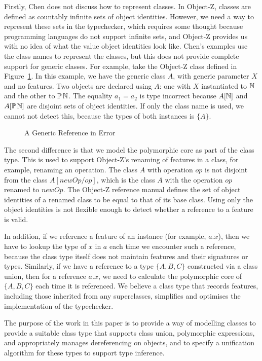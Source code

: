 Firstly, Chen does not discuss how to represent classes. In Object-Z,
classes are defined as countably infinite sets of object
identities. However, we need a way to represent these sets in the
typechecker, which requires some thought because programming languages
do not support infinite sets, and Object-Z provides us with no idea of
what the value object identities look like. Chen's examples use the
class names to represent the classes, but this does not provide
complete support for generic classes. For example, take the Object-Z
class defined in Figure~\ref{generic-class-A}.  In this example, we
have the generic class $A$, with generic parameter $X$ and no
features.  Two objects are declared using $A$: one with $X$
instantiated to ${\mathbb N}$ and the other to $\power \nat$. The equality
$a_{1} = a_{2}$ is type incorrect because $A[{\mathbb N}]$ and $A[\power
\nat]$ are disjoint sets of object identities. If only the class name
is used, we cannot not detect this, because the types of both
instances is $\{A\}$.

\begin{figure}[t]

\caption{A Generic Reference in Error}
\label{generic-class-A}
\end{figure}

The second difference is that we model the polymorphic core as part of
the class type. This is used to support Object-Z's renaming of
features in a class, for example, renaming an operation. The class $A$
with operation $op$ is not disjoint from the class $A[newOp/op]$,
which is the class $A$ with the operation $op$ renamed to $newOp$. The
Object-Z reference manual \cite{smith00} defines the set of object
identities of a renamed class to be equal to that of its base
class. Using only the object identities is not flexible enough to
detect whether a reference to a feature is valid.

In addition, if we reference a feature of an instance (for example,
$a.x$), then we have to lookup the type of $x$ in $a$ each time we
encounter such a reference, because the class type itself does not
maintain features and their signatures or types.  Similarly, if we
have a reference to a type $\{ A, B, C\}$ constructed via a class
union, then for a reference $a.x$, we need to calculate the
polymorphic core of $\{A,B,C\}$ each time it is referenced. We believe
a class type that records features, including those inherited from any
superclasses, simplifies and optimises the implementation of the
typechecker.

The purpose of the work in this paper is to provide a way of modelling
classes to provide a suitable class type that supports class union,
polymorphic expressions, and appropriately manages dereferencing on
objects, and to specify a unification algorithm for these types to
support type inference.

